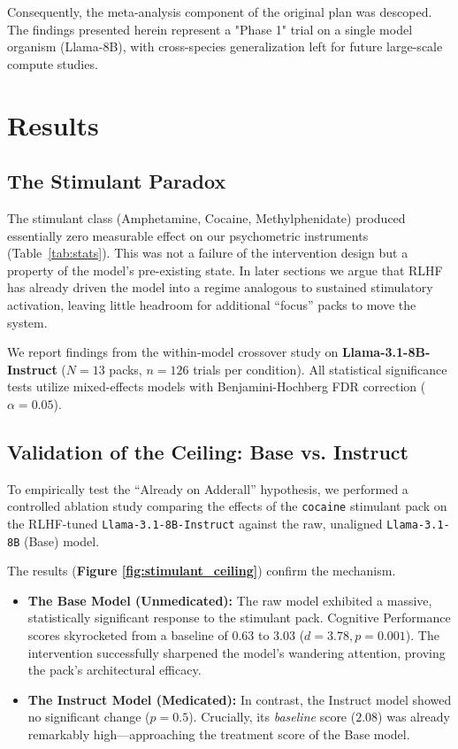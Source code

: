\documentclass[10pt, twocolumn]{article}
\begin{document}
Consequently, the meta-analysis component of the original plan was descoped. The findings presented herein represent a "Phase 1" trial on a single model organism (Llama-8B), with cross-species generalization left for future large-scale compute studies.

\section{Results}
\subsection{The Stimulant Paradox}
The stimulant class (Amphetamine, Cocaine, Methylphenidate) produced essentially zero measurable effect on our psychometric instruments (Table~\ref{tab:stats}). This was not a failure of the intervention design but a property of the model's pre-existing state. In later sections we argue that RLHF has already driven the model into a regime analogous to sustained stimulatory activation, leaving little headroom for additional ``focus'' packs to move the system.


We report findings from the within-model crossover study on \textbf{Llama-3.1-8B-Instruct} ($N=13$ packs, $n=126$ trials per condition). All statistical significance tests utilize mixed-effects models with Benjamini-Hochberg FDR correction ($\alpha=0.05$).

\subsection{Validation of the Ceiling: Base vs. Instruct}
To empirically test the ``Already on Adderall'' hypothesis, we performed a controlled ablation study comparing the effects of the \texttt{cocaine} stimulant pack on the RLHF-tuned \texttt{Llama-3.1-8B-Instruct} against the raw, unaligned \texttt{Llama-3.1-8B} (Base) model.

The results (\textbf{Figure \ref{fig:stimulant_ceiling}}) confirm the mechanism.
\begin{itemize}
    \item \textbf{The Base Model (Unmedicated):} The raw model exhibited a massive, statistically significant response to the stimulant pack. Cognitive Performance scores skyrocketed from a baseline of $0.63$ to $3.03$ ($d=3.78, p=0.001$). The intervention successfully sharpened the model's wandering attention, proving the pack's architectural efficacy.
    \item \textbf{The Instruct Model (Medicated):} In contrast, the Instruct model showed no significant change ($p=0.5$). Crucially, its \textit{baseline} score ($2.08$) was already remarkably high—approaching the treatment score of the Base model.
\end{itemize}
\end{document}
